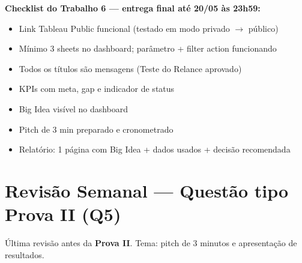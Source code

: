 \begin{SolvedBox}
\textbf{Checklist do Trabalho 6 — entrega final até 20/05 às 23h59:}
\begin{itemize}
  \item[$\square$] Link Tableau Public funcional (testado em modo privado $\to$ público)
  \item[$\square$] Mínimo 3 sheets no dashboard; parâmetro + filter action funcionando
  \item[$\square$] Todos os títulos são mensagens (Teste do Relance aprovado)
  \item[$\square$] KPIs com meta, gap e indicador de status
  \item[$\square$] Big Idea visível no dashboard
  \item[$\square$] Pitch de 3 min preparado e cronometrado
  \item[$\square$] Relatório: 1 página com Big Idea + dados usados + decisão recomendada
\end{itemize}
\end{SolvedBox}

\section{Revisão Semanal — Questão tipo Prova II (Q5)}

\begin{NoteBox}
Última revisão antes da \textbf{Prova II}. Tema: pitch de 3 minutos
e apresentação de resultados.
\end{NoteBox}

